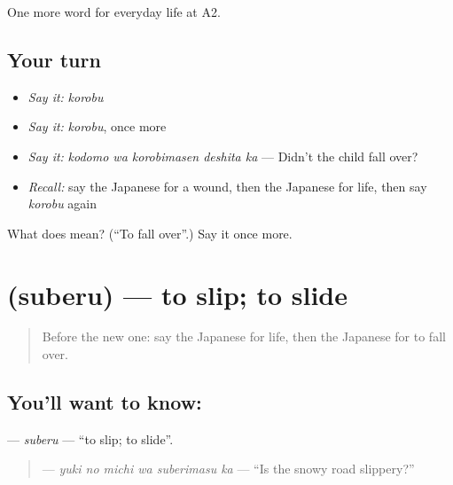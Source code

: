 \begin{grammarlens}[title={What you've built}]
One more word for everyday life at A2.
\end{grammarlens}

\subsection*{Your turn}
\begin{itemize}
\raggedright
  \item \emph{Say it:} \emph{korobu}
  \item \emph{Say it:} \emph{korobu}, once more
  \item \emph{Say it:} \emph{kodomo wa korobimasen deshita ka} — Didn't the child fall over?
  \item \emph{Recall:} say the Japanese for a wound, then the Japanese for life, then say \emph{korobu} again
\end{itemize}

\begin{tcolorbox}[breakable,colback=teal!4,colframe=teal!35!black,title={Before you move on}]
What does  mean? (\textquotedblleft{}To fall over\textquotedblright{}.) Say it once more.
\end{tcolorbox}
\section[\texorpdfstring{\ja{すべる} (suberu)}{すべる (suberu)}]{ (suberu) — to slip; to slide}

\label{lesson:JA-C219-suberu}



\begin{quote}
Before the new one: say the Japanese for life, then the Japanese for to fall over.
\end{quote}

\subsection*{You'll want to know: }
\textbf{} — \emph{suberu} — \textquotedblleft{}to slip; to slide\textquotedblright{}.

\begin{quote}
\textbf{  } — \emph{yuki no michi wa suberimasu ka} — \textquotedblleft{}Is the snowy road slippery?\textquotedblright{}
\end{quote}

